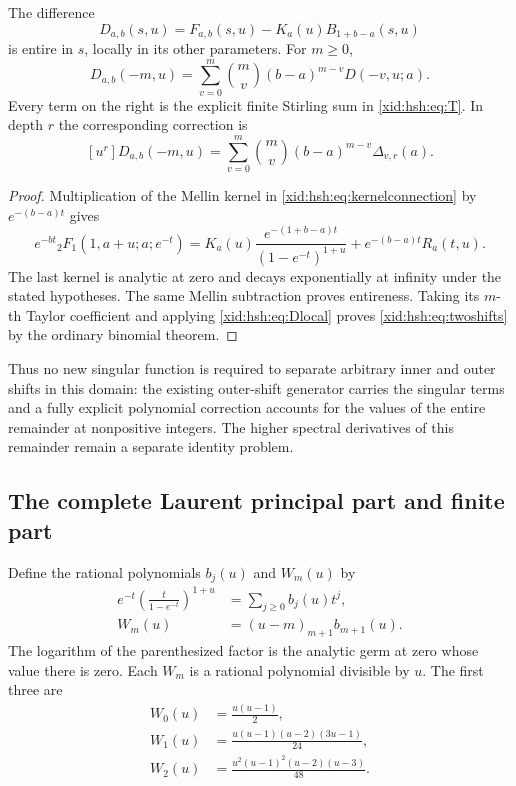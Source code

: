 \begin{corollary}
\label{xid:hsh:cor:twoshifts}
The difference
\[
 D_{a,b}(s,u)=F_{a,b}(s,u)-K_a(u)B_{1+b-a}(s,u)
\]
is entire in $s$, locally in its other parameters. For $m\ge0$,
\begin{equation}\label{xid:hsh:eq:twoshifts}
 D_{a,b}(-m,u)
   =\sum_{v=0}^m\binom mv(b-a)^{m-v}D(-v,u;a).
\end{equation}
Every term on the right is the explicit finite Stirling sum in
\eqref{xid:hsh:eq:T}. In depth $r$ the corresponding correction is
\[
 [u^r]D_{a,b}(-m,u)
    =\sum_{v=0}^m\binom mv(b-a)^{m-v}\Delta_{v,r}(a).
\]
\end{corollary}
\begin{proof}
Multiplication of the Mellin kernel in \eqref{xid:hsh:eq:kernelconnection}
by $e^{-(b-a)t}$ gives
\[
 e^{-bt}{}_2F_1(1,a+u;a;e^{-t})
   =K_a(u)\frac{e^{-(1+b-a)t}}{(1-e^{-t})^{1+u}}
         +e^{-(b-a)t}R_a(t,u).
\]
The last kernel is analytic at zero and decays exponentially at infinity
under the stated hypotheses. The same Mellin subtraction proves
entireness. Taking its $m$-th Taylor coefficient and applying
\eqref{xid:hsh:eq:Dlocal} proves \eqref{xid:hsh:eq:twoshifts} by the ordinary
binomial theorem.
\end{proof}

Thus no new singular function is required to separate arbitrary inner
and outer shifts in this domain: the existing outer-shift generator
carries the singular terms and a fully explicit polynomial correction
accounts for the values of the entire remainder at nonpositive integers.
The higher spectral derivatives of this remainder remain a separate
identity problem.

\subsection{The complete Laurent principal part and finite part}

Define the rational polynomials $b_j(u)$ and $W_m(u)$ by
\begin{align}
 e^{-t}\left(\frac{t}{1-e^{-t}}\right)^{1+u}
       &=\sum_{j\ge0}b_j(u)t^j,\label{xid:hsh:eq:b}\\
 W_m(u)&=(u-m)_{m+1}b_{m+1}(u).
       \label{xid:hsh:eq:W}
\end{align}
The logarithm of the parenthesized factor is the analytic germ at zero
whose value there is zero. Each $W_m$ is a rational polynomial divisible
by $u$. The first three are
\begin{align}
 W_0(u)&=\frac{u(u-1)}2,\label{xid:hsh:eq:W0}\\
 W_1(u)&=\frac{u(u-1)(u-2)(3u-1)}{24},\\
 W_2(u)&=\frac{u^2(u-1)^2(u-2)(u-3)}{48}.
\end{align}

